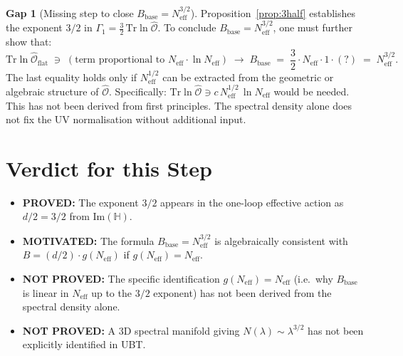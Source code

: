 \documentclass[11pt,a4paper]{article}
\theoremstyle{definition}
\newtheorem{gap}{Gap}
\theoremstyle{remark}
\begin{document}
\begin{gap}[Missing step to close $B_{\mathrm{base}} = N_{\mathrm{eff}}^{3/2}$]
\label{gap:missing}
  Proposition~\ref{prop:3half} establishes the exponent $3/2$ in
  $\Gamma_1 = \frac{3}{2}\,\mathrm{Tr}\ln\hat{\mathcal{O}}$.
  To conclude $B_{\mathrm{base}} = N_{\mathrm{eff}}^{3/2}$, one must further show that:
  \begin{equation}
    \mathrm{Tr}\ln\hat{\mathcal{O}}_{\mathrm{flat}}
    \;\ni\; (\text{term proportional to }N_{\mathrm{eff}}\cdot\ln N_{\mathrm{eff}})
    \;\longrightarrow\;
    B_{\mathrm{base}} \;=\; \frac{3}{2} \cdot N_{\mathrm{eff}} \cdot 1 \cdot (?)
    \;=\; N_{\mathrm{eff}}^{3/2}.
    \label{eq:missing_step}
  \end{equation}
  The last equality holds only if $N_{\mathrm{eff}}^{1/2}$ can be extracted from
  the geometric or algebraic structure of $\hat{\mathcal{O}}$.
  Specifically: $\mathrm{Tr}\ln\hat{\mathcal{O}} \ni c\,N_{\mathrm{eff}}^{1/2}\,\ln N_{\mathrm{eff}}$
  would be needed.
  This has not been derived from first principles.
  The spectral density alone does not fix the UV normalisation without
  additional input.
\end{gap}

\section{Verdict for this Step}
\label{sec:verdict}

\begin{itemize}
  \item[$\checkmark$] \textbf{PROVED:} The exponent $3/2$ appears in the
    one-loop effective action as $d/2 = 3/2$ from $\mathrm{Im}(\mathbb{H})$.
  \item[$\checkmark$] \textbf{MOTIVATED:} The formula
    $B_{\mathrm{base}} = N_{\mathrm{eff}}^{3/2}$ is algebraically consistent
    with $B = (d/2) \cdot g(N_{\mathrm{eff}})$ if $g(N_{\mathrm{eff}}) = N_{\mathrm{eff}}$.
  \item[$\times$] \textbf{NOT PROVED:} The specific identification
    $g(N_{\mathrm{eff}}) = N_{\mathrm{eff}}$ (i.e.\ why $B_{\mathrm{base}}$ is linear in
    $N_{\mathrm{eff}}$ up to the $3/2$ exponent) has not been derived from
    the spectral density alone.
  \item[$\times$] \textbf{NOT PROVED:} A 3D spectral manifold giving
    $N(\lambda) \sim \lambda^{3/2}$ has not been explicitly identified in UBT.
\end{itemize}

\ifdefined\INCLUDEMODE\else
\end{document}
